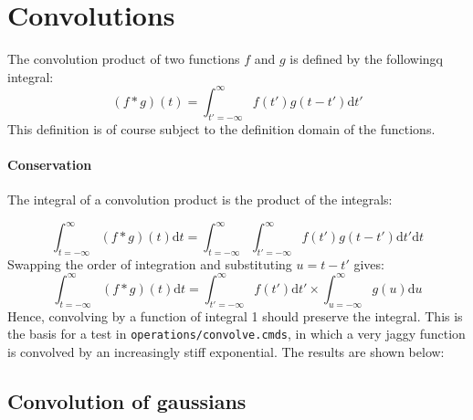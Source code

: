 \documentclass{article}
\newcommand{\dd}{\mathrm{d}}
\begin{document}
\section{Convolutions}

The convolution product of two functions $f$ and $g$ is defined by the
followingq integral:
%
\begin{equation}
  (f\mathop{*}g)(t) = \int_{t' = -\infty}^{\infty} f(t') g(t-t') \dd t'
  \label{eq:convolution}
\end{equation}
%
This definition is of course subject to the definition domain of the
functions.

\paragraph{Conservation} The integral of a convolution product is the
product of the integrals:

\begin{equation}
  \int_{t = -\infty}^{\infty}(f\mathop{*}g)(t)\dd t
  = \int_{t = -\infty}^{\infty}\int_{t' = -\infty}^{\infty} f(t')
  g(t-t') \dd t'\dd t
\end{equation}
%
Swapping the order of integration and substituting $u = t-t'$ gives:
\begin{equation}
  \int_{t = -\infty}^{\infty}(f\mathop{*}g)(t)\dd t
  = \int_{t' = -\infty}^{\infty} f(t') \dd t'
   \times \int_{u = -\infty}^{\infty}
   g(u) \dd u
\end{equation}
%
Hence, convolving by a function of integral 1 should preserve the
integral. This is the basis for a test in
\texttt{operations/convolve.cmds}, in which a very jaggy function is
convolved by an increasingly stiff exponential. The results are shown
below:

\begin{testresult}
  \begin{center}
  \end{center}
  \caption{Results of the tests of conserving the integral while
    convolving a jaggy function with a stiff exponential in
    \texttt{operations/convolve.cmds}}
\end{testresult}


\subsection{Convolution of gaussians}
\end{document}
